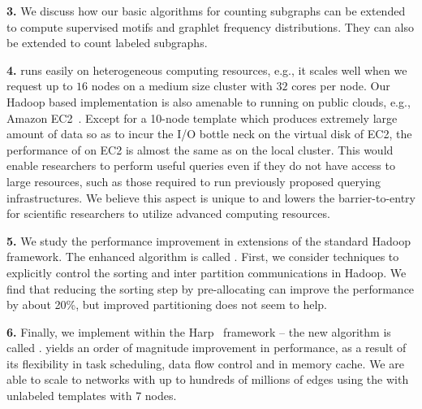 \smallskip
\textbf{3.} We discuss how our basic algorithms for counting subgraphs can
be extended to compute supervised motifs and graphlet frequency distributions.
They can also be extended to count labeled subgraphs.

\smallskip
\textbf{4.} \sahad{} runs easily on heterogeneous computing resources, e.g., it
scales well when we request up to $16$ nodes on a medium size cluster with $32$
cores per node. Our Hadoop based implementation is also amenable to running on
public clouds, e.g., Amazon EC2~\cite{Web:Amazon-EC2}. Except for a 10-node
template which produces extremely large amount of data so as to incur the I/O
bottle neck on the virtual disk of EC2, the performance of \sahad{} on
EC2 is almost the same as on the local cluster. This would enable researchers
to perform useful queries even if they do not have access to large resources,
such as those required to run previously proposed querying infrastructures. We
believe this aspect is unique to \sahad{} and lowers the barrier-to-entry
for scientific researchers to utilize advanced computing resources.

\smallskip
\textbf{5.}  We study the performance improvement in extensions of the standard
Hadoop framework. The enhanced algorithm is called \ensahad{}.
First, we consider techniques to explicitly
control the sorting and inter partition communications in Hadoop. We find
that reducing the sorting step by pre-allocating can improve the
performance by about 20\%, but improved partitioning does not seem to help.


\smallskip
\textbf{6.} Finally, we implement \sahad{} within the Harp~\cite{qiu2014towards} framework
-- the new algorithm is called \harpsahad{}.  \harpsahad{}
yields an order of magnitude improvement in performance, as a result of
its flexibility in task scheduling, data flow control and in memory cache. We
are able to scale to networks with up to hundreds of millions of edges using the
\harpsahad{} 
with unlabeled templates with 7 nodes. 





